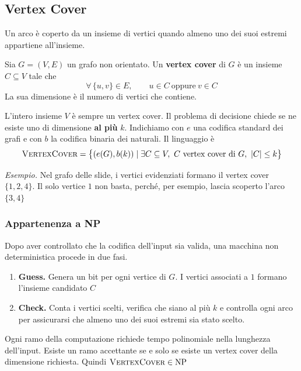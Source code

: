 \subsection{Vertex Cover}
Un arco è coperto da un insieme di vertici quando almeno uno
dei suoi estremi appartiene all'insieme.

\medskip
\noindent
\colorbox{SALZO}{\parbox{\dimexpr\linewidth-2\fboxsep}{
\begin{definition}
    Sia $G=(V,E)$ un grafo non orientato. Un \textbf{vertex cover}
    di $G$ è un insieme $C\subseteq V$ tale che
    \[
        \forall\,\{u,v\}\in E,\qquad u\in C\ \text{oppure}\ v\in C
    \]
    La sua dimensione è il numero di vertici che contiene.
\end{definition}
}}%

\medskip
\noindent
L'intero insieme $V$ è sempre un vertex cover. Il problema di
decisione chiede se ne esiste uno di dimensione \textbf{al più}
$k$. Indichiamo con $e$ una codifica standard dei grafi e con
$b$ la codifica binaria dei naturali. Il linguaggio è
\[
    \textsc{VertexCover}
    =\bigl\{(e(G),b(k))\mid
        \exists C\subseteq V,\ C\text{ vertex cover di }G,\ |C|\le k\bigr\}
\]

\noindent
\textit{Esempio.} Nel grafo delle slide, i vertici evidenziati
formano il vertex cover $\{1,2,4\}$. Il solo vertice $1$ non
basta, perché, per esempio, lascia scoperto l'arco $\{3,4\}$

\begin{center}
\end{center}

\subsubsection*{Appartenenza a NP}
Dopo aver controllato che la codifica dell'input sia valida,
una macchina non deterministica procede in due fasi.
\begin{enumerate}
    \item \textbf{Guess.} Genera un bit per ogni vertice di $G$.
          I vertici associati a $1$ formano l'insieme candidato $C$
    \item \textbf{Check.} Conta i vertici scelti, verifica che
          siano al più $k$ e controlla ogni arco per assicurarsi
          che almeno uno dei suoi estremi sia stato scelto.
\end{enumerate}
\noindent
Ogni ramo della computazione richiede tempo polinomiale nella
lunghezza dell'input. Esiste un ramo accettante se e solo se
esiste un vertex cover della dimensione richiesta. Quindi
$\textsc{VertexCover}\in\mathrm{NP}$

